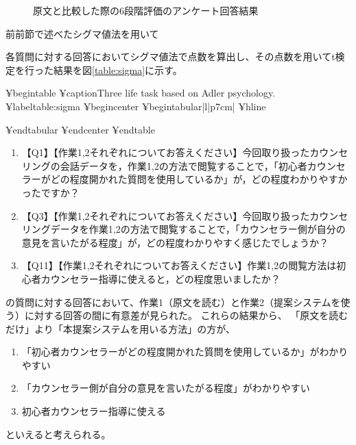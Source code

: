 \documentclass[shuuron]{kuee}
\begin{document}
\begin{figure}
   \begin{center}
   \end{center}
   \caption{原文と比較した際の6段階評価のアンケート回答結果}
   \label{fig:genbunAnketo}
 \end{figure}

前前節で述べたシグマ値法を用いて

各質問に対する回答においてシグマ値法で点数を算出し、その点数を用いてt検定を行った結果を図\ref{table:sigma}に示す。

¥begin{table}
¥caption{Three life task based on Adler psychology.}
¥label{table:sigma}
¥begin{center}
¥begin{tabular}{|l|p{7cm}|} ¥hline

¥end{tabular}
¥end{center}
¥end{table}




\begin{enumerate}

 \item 【Q1】【作業1,2それぞれについてお答えください】今回取り扱ったカウンセリングの会話データを，作業1,2の方法で閲覧することで，「初心者カウンセラーがどの程度開かれた質問を使用しているか」が，どの程度わかりやすかったですか？
  \item 【Q3】【作業1,2それぞれについてお答えください】今回取り扱ったカウンセリングデータを作業1,2の方法で閲覧することで，「カウンセラー側が自分の意見を言いたがる程度」が，どの程度わかりやすく感じたでしょうか？
   \item 【Q11】【作業1,2それぞれについてお答えください】作業1,2の閲覧方法は初心者カウンセラー指導に使えると，どの程度思いましたか？
\end{enumerate}

の質問に対する回答において、作業1（原文を読む）と作業2（提案システムを使う）に対する回答の間に有意差が見られた。
これらの結果から、
「原文を読むだけ」より「本提案システムを用いる方法」の方が、
\begin{enumerate}

 \item 「初心者カウンセラーがどの程度開かれた質問を使用しているか」がわかりやすい
  \item 「カウンセラー側が自分の意見を言いたがる程度」がわかりやすい
   \item 初心者カウンセラー指導に使える
\end{enumerate}
といえると考えられる。
\end{document}

